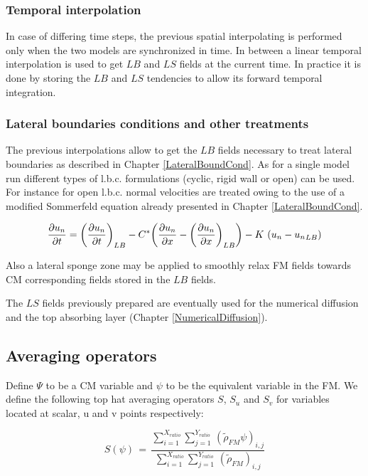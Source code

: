 \subsubsection{Temporal interpolation}

In case of differing time steps, the previous spatial interpolating is
performed only when the two models are synchronized in time. In between
a linear temporal interpolation is used to get $LB$ and $LS$ fields at the
current time.
In practice it is done by storing the $LB$ and $LS$ tendencies to allow its
forward temporal integration.

\subsubsection{Lateral boundaries conditions and other treatments}

The previous interpolations allow to get the $LB$ fields necessary to
treat lateral boundaries as described in Chapter \ref{LateralBoundCond}.
As for a single model
run different types of l.b.c. formulations (cyclic, rigid wall or open) can
be used. For instance for open l.b.c. normal velocities are treated owing
to the use of a modified Sommerfeld equation already presented
in Chapter \ref{LateralBoundCond}.

\begin{equation}
\label{carpenter2}
{\partial u_n \over \partial t} =             {\left({{\partial u_n \over \partial t}}\right)}_{LB}
- C^*{\left(  {\partial u_n \over \partial x}  -  {\left({{\partial u_n \over \partial x}}\right)}_{LB}  \right)}
- K \, \, {\left( u_n - {u_n}_{LB}   \right)}
\end{equation}

Also a lateral sponge zone may be applied to smoothly relax FM
fields towards CM corresponding fields stored in the $LB$ fields.

The $LS$ fields previously prepared are eventually used for the numerical
diffusion and the top absorbing layer (Chapter \ref{NumericalDiffusion}).

\subsection{Averaging operators}

Define $\Psi$ to be a CM variable and $\psi$ to be the equivalent
variable in the FM. We define the following top hat averaging operators
$S$, $S_u$ and $S_v$ for variables located at scalar, u and v points
respectively:

\begin{equation}
\label{averaging-op}
 S ( \psi) \, = \, \dfrac{
 \sum_{i=1}^{X_{ratio}} \sum_{j=1}^{Y_{ratio}} \,
\left( \tilde{\rho}_{FM} \psi \right)_{i,j}          }
{
 \sum_{i=1}^{X_{ratio}} \sum_{j=1}^{Y_{ratio}} \,
\left( \tilde{\rho}_{FM} \right)_{i,j}               }
\end{equation}


